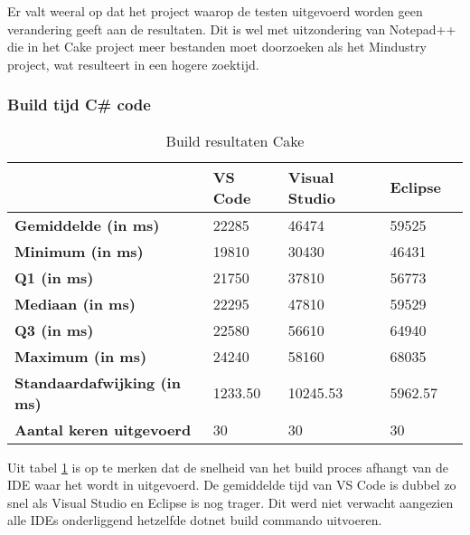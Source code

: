 Er valt weeral op dat het project waarop de testen uitgevoerd worden geen verandering geeft aan de resultaten. Dit is wel met uitzondering van Notepad++ die in het Cake project meer bestanden moet doorzoeken als het Mindustry project, wat resulteert in een hogere zoektijd.

\newpage

\subsubsection{Build tijd C\# code}

\begin{table}[h]
	\centering
	\begin{tabular}{ l l l l l }
		\hline
		                                    & \textbf{VS Code} & \textbf{Visual Studio} & \textbf{Eclipse} \\
		\hline
		\textbf{Gemiddelde (in ms)}         & 22285            & 46474                  & 59525            \\[1ex]

		\textbf{Minimum (in ms) }           & 19810            & 30430                  & 46431            \\
		\textbf{Q1 (in ms)}                 & 21750            & 37810                  & 56773            \\
		\textbf{Mediaan (in ms)}            & 22295            & 47810                  & 59529            \\
		\textbf{Q3 (in ms)}                 & 22580            & 56610                  & 64940            \\
		\textbf{Maximum (in ms)}            & 24240            & 58160                  & 68035            \\[1ex]

		\textbf{Standaardafwijking (in ms)} & 1233.50          & 10245.53               & 5962.57          \\
		\textbf{Aantal keren uitgevoerd}    & 30               & 30                     & 30               \\
		\hline
	\end{tabular}
	\caption{Build resultaten Cake}
	\label{tab:resultatenBuildCake}
\end{table}

Uit tabel \ref{tab:resultatenBuildCake} is op te merken dat de snelheid van het build proces afhangt van de IDE waar het wordt in uitgevoerd. De gemiddelde tijd van VS Code is dubbel zo snel als Visual Studio en Eclipse is nog trager. Dit werd niet verwacht aangezien alle IDEs onderliggend hetzelfde dotnet build commando uitvoeren.

